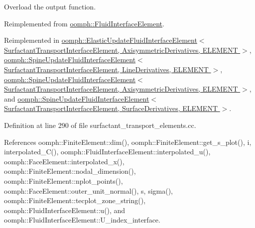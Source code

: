 Overload the output function. 



Reimplemented from \hyperlink{classoomph_1_1FluidInterfaceElement_a213b1a40132a9605ee8bd31c88b225e0}{oomph\+::\+Fluid\+Interface\+Element}.



Reimplemented in \hyperlink{classoomph_1_1ElasticUpdateFluidInterfaceElement_ac193aa64a8223a96e4148a5af456fb64}{oomph\+::\+Elastic\+Update\+Fluid\+Interface\+Element$<$ Surfactant\+Transport\+Interface\+Element, Axisymmetric\+Derivatives, E\+L\+E\+M\+E\+N\+T $>$}, \hyperlink{classoomph_1_1SpineUpdateFluidInterfaceElement_a3c9c00def11f68f48db0f46004f1e6fe}{oomph\+::\+Spine\+Update\+Fluid\+Interface\+Element$<$ Surfactant\+Transport\+Interface\+Element, Line\+Derivatives, E\+L\+E\+M\+E\+N\+T $>$}, \hyperlink{classoomph_1_1SpineUpdateFluidInterfaceElement_a3c9c00def11f68f48db0f46004f1e6fe}{oomph\+::\+Spine\+Update\+Fluid\+Interface\+Element$<$ Surfactant\+Transport\+Interface\+Element, Axisymmetric\+Derivatives, E\+L\+E\+M\+E\+N\+T $>$}, and \hyperlink{classoomph_1_1SpineUpdateFluidInterfaceElement_a3c9c00def11f68f48db0f46004f1e6fe}{oomph\+::\+Spine\+Update\+Fluid\+Interface\+Element$<$ Surfactant\+Transport\+Interface\+Element, Surface\+Derivatives, E\+L\+E\+M\+E\+N\+T $>$}.



Definition at line 290 of file surfactant\+\_\+transport\+\_\+elements.\+cc.



References oomph\+::\+Finite\+Element\+::dim(), oomph\+::\+Finite\+Element\+::get\+\_\+s\+\_\+plot(), i, interpolated\+\_\+\+C(), oomph\+::\+Fluid\+Interface\+Element\+::interpolated\+\_\+u(), oomph\+::\+Face\+Element\+::interpolated\+\_\+x(), oomph\+::\+Finite\+Element\+::nodal\+\_\+dimension(), oomph\+::\+Finite\+Element\+::nplot\+\_\+points(), oomph\+::\+Face\+Element\+::outer\+\_\+unit\+\_\+normal(), s, sigma(), oomph\+::\+Finite\+Element\+::tecplot\+\_\+zone\+\_\+string(), oomph\+::\+Fluid\+Interface\+Element\+::u(), and oomph\+::\+Fluid\+Interface\+Element\+::\+U\+\_\+index\+\_\+interface.

\mbox{\label{classoomph_1_1SurfactantTransportInterfaceElement_a32ae151a017b122dd7a4c03511afbcc9}} 
